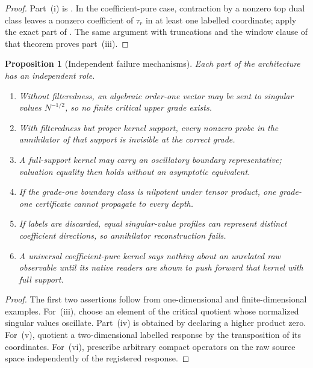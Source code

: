 \documentclass[10pt,reqno]{amsart}
\theoremstyle{plain}
\newtheorem{proposition}[theorem]{Proposition}
\theoremstyle{definition}
\theoremstyle{remark}
\begin{document}
\begin{proof}
Part~\textup{(i)} is
.  In the
coefficient-pure case, contraction by a nonzero top dual class leaves a
nonzero coefficient of $\tau_r$ in at least one labelled coordinate; apply
the exact part of .  The same argument
with truncations and the window clause of that theorem proves part~\textup{(iii)}.
\end{proof}

\begin{proposition}[Independent failure mechanisms]
\label{rk:prop-minimality}
Each part of the architecture has an independent role.
\begin{enumerate}[label=\textup{(\roman*)},leftmargin=2.8em]
\item Without filteredness, an algebraic order-one vector may be sent to
      singular values $N^{-1/2}$, so no finite critical upper grade exists.
\item With filteredness but proper kernel support, every nonzero probe in the
      annihilator of that support is invisible at the correct grade.
\item A full-support kernel may carry an oscillatory boundary representative;
      valuation equality then holds without an asymptotic equivalent.
\item If the grade-one boundary class is nilpotent under tensor product, one
      grade-one certificate cannot propagate to every depth.
\item If labels are discarded, equal singular-value profiles can represent
      distinct coefficient directions, so annihilator reconstruction fails.
\item A universal coefficient-pure kernel says nothing about an unrelated raw
      observable until its native readers are shown to push forward that
      kernel with full support.
\end{enumerate}
\end{proposition}

\begin{proof}
The first two assertions follow from one-dimensional and finite-dimensional
examples.  For~\textup{(iii)}, choose an element of the critical quotient
whose normalized singular values oscillate.  Part~\textup{(iv)} is obtained
by declaring a higher product zero.  For~\textup{(v)}, quotient a
two-dimensional labelled response by the transposition of its coordinates.
For~\textup{(vi)}, prescribe arbitrary compact operators on the raw source
space independently of the registered response.
\end{proof}
\end{document}
